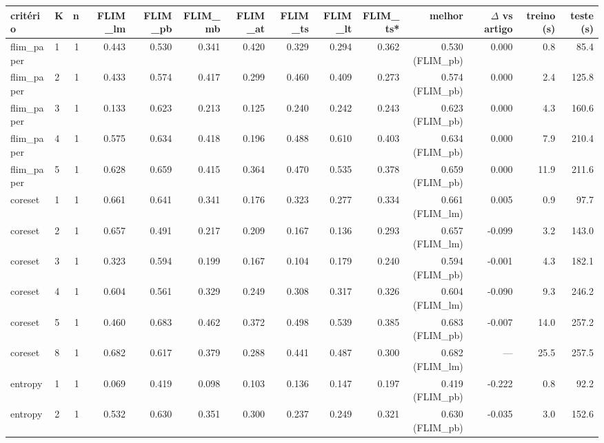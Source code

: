 \begin{adjustbox}{max width=\linewidth}
\begin{tabular}{llrrrrrrrrrrrr}
\toprule
critério & K & n & FLIM\_lm & FLIM\_pb & FLIM\_mb & FLIM\_at & FLIM\_ts & FLIM\_lt & FLIM\_ts* & melhor & $\Delta$ vs artigo & treino (s) & teste (s) \\
\midrule
flim\_paper & 1 & 1 & 0.443 & 0.530 & 0.341 & 0.420 & 0.329 & 0.294 & 0.362 & 0.530 (FLIM\_pb) & 0.000 & 0.8 & 85.4 \\
flim\_paper & 2 & 1 & 0.433 & 0.574 & 0.417 & 0.299 & 0.460 & 0.409 & 0.273 & 0.574 (FLIM\_pb) & 0.000 & 2.4 & 125.8 \\
flim\_paper & 3 & 1 & 0.133 & 0.623 & 0.213 & 0.125 & 0.240 & 0.242 & 0.243 & 0.623 (FLIM\_pb) & 0.000 & 4.3 & 160.6 \\
flim\_paper & 4 & 1 & 0.575 & 0.634 & 0.418 & 0.196 & 0.488 & 0.610 & 0.403 & 0.634 (FLIM\_pb) & 0.000 & 7.9 & 210.4 \\
flim\_paper & 5 & 1 & 0.628 & 0.659 & 0.415 & 0.364 & 0.470 & 0.535 & 0.378 & 0.659 (FLIM\_pb) & 0.000 & 11.9 & 211.6 \\
coreset & 1 & 1 & 0.661 & 0.641 & 0.341 & 0.176 & 0.323 & 0.277 & 0.334 & 0.661 (FLIM\_lm) & 0.005 & 0.9 & 97.7 \\
coreset & 2 & 1 & 0.657 & 0.491 & 0.217 & 0.209 & 0.167 & 0.136 & 0.293 & 0.657 (FLIM\_lm) & -0.099 & 3.2 & 143.0 \\
coreset & 3 & 1 & 0.323 & 0.594 & 0.199 & 0.167 & 0.104 & 0.179 & 0.240 & 0.594 (FLIM\_pb) & -0.001 & 4.3 & 182.1 \\
coreset & 4 & 1 & 0.604 & 0.561 & 0.329 & 0.249 & 0.308 & 0.317 & 0.326 & 0.604 (FLIM\_lm) & -0.090 & 9.3 & 246.2 \\
coreset & 5 & 1 & 0.460 & 0.683 & 0.462 & 0.372 & 0.498 & 0.539 & 0.385 & 0.683 (FLIM\_pb) & -0.007 & 14.0 & 257.2 \\
coreset & 8 & 1 & 0.682 & 0.617 & 0.379 & 0.288 & 0.441 & 0.487 & 0.300 & 0.682 (FLIM\_lm) & --- & 25.5 & 257.5 \\
entropy & 1 & 1 & 0.069 & 0.419 & 0.098 & 0.103 & 0.136 & 0.147 & 0.197 & 0.419 (FLIM\_pb) & -0.222 & 0.8 & 92.2 \\
entropy & 2 & 1 & 0.532 & 0.630 & 0.351 & 0.300 & 0.237 & 0.249 & 0.321 & 0.630 (FLIM\_pb) & -0.035 & 3.0 & 152.6 \\

\end{tabular}
\end{adjustbox}
